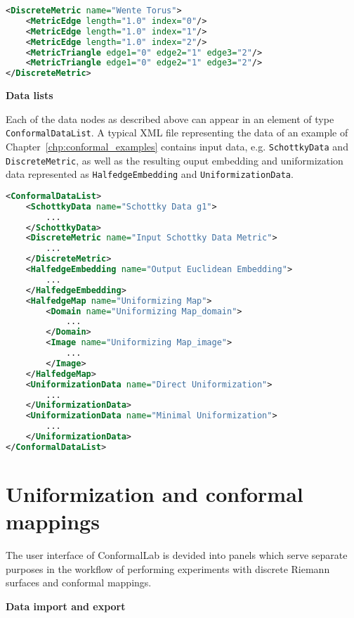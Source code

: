 \documentclass[Thesis.tex]{subfiles}
\begin{document}
\begin{lstlisting}[label=lst:discretemetric_xml, caption={A wente torus given by a discrete metric. Vertices are given implictly
by following the order of triangle glueings.}, numbers=none, language=XML, captionpos=b]
<DiscreteMetric name="Wente Torus">
	<MetricEdge length="1.0" index="0"/>
	<MetricEdge length="1.0" index="1"/>
	<MetricEdge length="1.0" index="2"/>
	<MetricTriangle edge1="0" edge2="1" edge3="2"/>
	<MetricTriangle edge1="0" edge2="1" edge3="2"/>
</DiscreteMetric>
\end{lstlisting}

{\bf Data lists}

Each of the data nodes as described above can appear in an element of type {\tt ConformalDataList}. A typical 
XML file representing the data of an example of Chapter~\ref{chp:conformal_examples} contains input
data, e.g. {\tt SchottkyData} and {\tt DiscreteMetric}, as well as the resulting ouput embedding and uniformization data represented as {\tt HalfedgeEmbedding} and {\tt UniformizationData}.

\begin{lstlisting}[label=lst:datalist_xml, caption={A list of data XML nodes as the result of an algorithm calculating the Fuchsian uniformization of a genus $1$ Riemann surface given by Schottky data.}, numbers=none, language=XML, captionpos=b]
<ConformalDataList>
	<SchottkyData name="Schottky Data g1">
		...
	</SchottkyData>
	<DiscreteMetric name="Input Schottky Data Metric">
		...
	</DiscreteMetric>
	<HalfedgeEmbedding name="Output Euclidean Embedding">
		...
	</HalfedgeEmbedding>
	<HalfedgeMap name="Uniformizing Map">
		<Domain name="Uniformizing Map_domain">
			...
		</Domain>
		<Image name="Uniformizing Map_image">
			...
		</Image>
	</HalfedgeMap>
	<UniformizationData name="Direct Uniformization">
		...
	</UniformizationData>
	<UniformizationData name="Minimal Uniformization">
		...
	</UniformizationData>
</ConformalDataList>
\end{lstlisting}

\section{Uniformization and conformal mappings}
\label{sec:conformallab_ui}
The user interface of {\sc ConformalLab} is devided into panels which serve separate purposes in the 
workflow of performing experiments with discrete Riemann surfaces and conformal mappings.

{\bf Data import and export}
\end{document}
